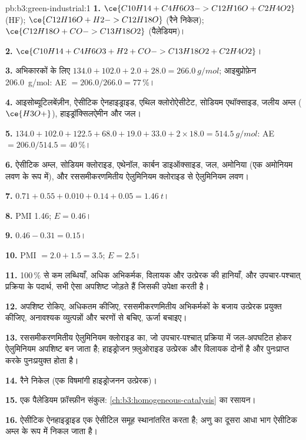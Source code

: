 \begin{solution}{pb:b3:green-industrial:1}
\textbf{1.} $\ce{C10H14 + C4H6O3 -> C12H16O + C2H4O2}$ (HF); $\ce{C12H16O + H2 -> C12H18O}$ (रैने निकेल);
$\ce{C12H18O + CO -> C13H18O2}$ (पैलेडियम)।

\textbf{2.} $\ce{C10H14 + C4H6O3 + H2 + CO -> C13H18O2 + C2H4O2}$।

\textbf{3.} अभिकारकों के लिए $134.0 + 102.0 + 2.0 + 28.0 = \qty{266.0}{g/mol}$; आइबुप्रोफ़ेन \qty{206.0}{g/mol}: AE $= 206.0/266.0 = 77$\,\%।

\textbf{4.} आइसोब्यूटिलबेंज़ीन, ऐसीटिक ऐनहाइड्राइड, एथिल क्लोरोऐसीटेट, सोडियम एथॉक्साइड,
जलीय अम्ल ($\ce{H3O+}$), हाइड्रॉक्सिलऐमीन और जल।

\textbf{5.} $134.0 + 102.0 + 122.5 + 68.0 + 19.0 + 33.0 + 2 \times 18.0 = \qty{514.5}{g/mol}$: AE $= 206.0/514.5 = 40$\,\%।

\textbf{6.} ऐसीटिक अम्ल, सोडियम क्लोराइड, एथेनॉल, कार्बन डाइऑक्साइड, जल, अमोनिया (एक
अमोनियम लवण के रूप में), और रससमीकरणमितीय ऐलुमिनियम क्लोराइड से ऐलुमिनियम लवण।

\textbf{7.} $0.71 + 0.55 + 0.010 + 0.14 + 0.05 = \qty{1.46}{t}$।

\textbf{8.} PMI 1.46; $E = 0.46$।

\textbf{9.} $0.46 - 0.31 = 0.15$।

\textbf{10.} PMI $= 2.0 + 1.5 = 3.5$; $E = 2.5$।

\textbf{11.} 100\,\% से कम लब्धियाँ, अधिक अभिकर्मक, विलायक और उत्प्रेरक की हानियाँ, और
उपचार-पश्चात् प्रक्रिया के पदार्थ, सभी ऐसा अपशिष्ट जोड़ते हैं जिसकी  उपेक्षा करती है।

\textbf{12.} अपशिष्ट रोकिए,  अधिकतम कीजिए, रससमीकरणमितीय अभिकर्मकों के बजाय
उत्प्रेरक प्रयुक्त कीजिए, अनावश्यक व्युत्पन्नों और चरणों से बचिए, ऊर्जा बचाइए।

\textbf{13.} रससमीकरणमितीय ऐलुमिनियम क्लोराइड का, जो उपचार-पश्चात् प्रक्रिया में जल-अपघटित होकर ऐलुमिनियम
अपशिष्ट बन जाता है; हाइड्रोजन फ़्लुओराइड उत्प्रेरक और विलायक दोनों है और पुनःप्राप्त करके पुनःप्रयुक्त होता है।

\textbf{14.} रैने निकेल (एक विषमांगी हाइड्रोजनन उत्प्रेरक)।

\textbf{15.} एक पैलेडियम फ़ॉस्फ़ीन संकुल: \cref{ch:b3:homogeneous-catalysis} का
 रसायन।

\textbf{16.} ऐसीटिक ऐनहाइड्राइड एक ऐसीटिल समूह स्थानांतरित करता है; अणु का दूसरा आधा भाग
ऐसीटिक अम्ल के रूप में निकल जाता है।


\end{solution}
